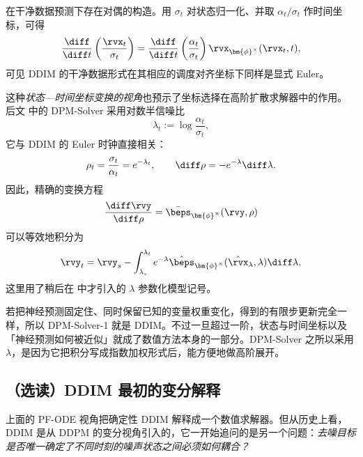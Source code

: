 
在干净数据预测下存在对偶的构造。用 $\sigma_t$ 对状态归一化、并取 $\alpha_t/\sigma_t$ 作时间坐标，可得
\[
\frac{\diff}{\diff t} \left( \frac{\rvx_t}{\sigma_t} \right) = \frac{\diff}{\diff t} \left( \frac{\alpha_t}{\sigma_t} \right) \rvx_{\bm{\phi}^\times}(\rvx_t,t),
\]
可见 DDIM 的干净数据形式在其相应的调度对齐坐标下同样是显式 Euler。

这种\emph{状态—时间坐标变换的视角}也预示了坐标选择在高阶扩散求解器中的作用。后文  中的 DPM-Solver 采用对数半信噪比
\[
\lambda_t
:=
\log\frac{\alpha_t}{\sigma_t},
\]
它与 DDIM 的 Euler 时钟直接相关：
\[
\rho_t
=
\frac{\sigma_t}{\alpha_t}
=
e^{-\lambda_t},
\qquad
\diff\rho
=
-e^{-\lambda}\diff\lambda.
\]
因此，精确的变换方程
\[
\frac{\diff\rvy}{\diff\rho}
=
\bar{\beps}_{\bm{\phi}^\times}(\rvy,\rho)
\]
可以等效地积分为
\[
\rvy_t
=
\rvy_s
-
\int_{\lambda_s}^{\lambda_t}
e^{-\lambda}
\hat{\beps}_{\bm{\phi}^\times}
(\hat\rvx_\lambda,\lambda)
\diff\lambda,
\]
这里用了稍后在  中才引入的 $\lambda$ 参数化模型记号。

若把神经预测固定住、同时保留已知的变量权重变化，得到的有限步更新完全一样，所以 DPM-Solver-1 就是 DDIM。不过一旦超过一阶，状态与时间坐标以及「神经预测如何被近似」就成了数值方法本身的一部分。DPM-Solver 之所以采用 $\lambda$，是因为它把积分写成指数加权形式后，能方便地做高阶展开。


\subsection{（选读）DDIM 最初的变分解释}\label{subsec:ddim}

上面的 PF-ODE 视角把确定性 DDIM 解释成一个数值求解器。但从历史上看，DDIM 是从 DDPM 的变分视角引入的，它一开始追问的是另一个问题：\emph{去噪目标是否唯一确定了不同时刻的噪声状态之间必须如何耦合？}

